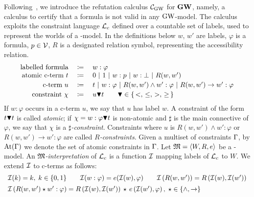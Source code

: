 Following~\cite{BilkovaFK:22,FerFioRod:2025}, we introduce the
refutation calculus $\mathcal{C}_{\mathrm{GW}}$ for $\mathbf{GW}$, namely, a calculus to certify
that a formula is not valid in any $\mbox{$\mathrm{GW}$}$-model.  The calculus
exploits the constraint language $\mathcal{L}_c$ defined over a countable set
of labels, used to represent the worlds of a \GWM-model.  In the
 definitions  below $w$, $w'$ are labels, $\varphi$  is a
formula, $p\in \mathcal{V}$, $R$ is a designated relation symbol, representing
the accessibility relation.
\[
\begin{array}{rcl}
  \mbox{labelled formula} & \;\coloneqq&\; w :\varphi                            
  \\
  \mbox{atomic c-term $t$}  &\; \coloneqq&\; 0~|~1~|~w :p~|~w :\bot~|~R(w,w')
  \\[.5ex]
  \mbox{c-term $u$}  & \;\coloneqq&\; t~|~w : \varphi~|~R(w,w')\land w':\varphi~|~R(w,w')\to w':\varphi
  \\[.5ex]
  \mbox{constraint $\chi$}   &\; \coloneqq&\; u \blacktriangledown t \qquad \blacktriangledown\in \{\,<,\,\leq,\,>,\,\geq\,\}
\end{array}
\]
If  $w:\varphi$ occurs in   a c-term $u$, we say  that $u$ has label $w$.
A constraint of the form $t \blacktriangledown t$ is called \emph{atomic};
if $\chi= w:\varphi \blacktriangledown t$ is non-atomic and $\sharp$ is
the main connective of $\varphi$, we say that $\chi$ is a
\emph{$\sharp$-constraint}.
Constraints where $u$ is   $R(w,w')\land w':\varphi$ or
$R(w,w')\to w':\varphi$ are called
\emph{$R$-constraints}.
Given a multiset of constraints $\Gamma$, by
$\mathrm{At}(\Gamma)$ we denote the set of atomic constraints in $\Gamma$.
Let $\mathfrak{M}=\langle W,R,e \rangle$ be a \GWM-model. An \emph{$\mathfrak{M}$-interpretation} of
$\mathcal{L}_c$ is a function $\mathcal{I}$ mapping labels of $\mathcal{L}_c$ to $W$.
We extend $\mathcal{I}$ to c-terms as follows:
\[
  \begin{array}{l}
    \mathcal{I}(k) = k,\;k\in\{0,1\}
    \qquad
    \mathcal{I}( w:\varphi) = e(\mathcal{I}(w), \varphi)
    \qquad
    \mathcal{I}\left(R(w,w')\right) =  R\left(\mathcal{I}(w),\mathcal{I}(w')\right)
    \\[1ex]
    \mathcal{I}\left(R(w,w') \star w':\varphi\right) =
   R\left(\mathcal{I}(w),\mathcal{I}(w')\right) \,\star\, e\left(\mathcal{I}(w'),\varphi\right),\;\star\in\{\land, \to\}
  \end{array}
\]  
